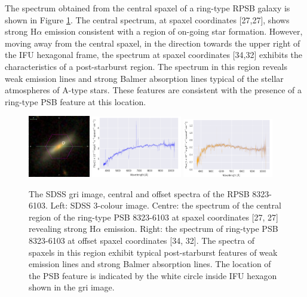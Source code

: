 The spectrum obtained from the central spaxel of a ring-type RPSB galaxy is shown in Figure \ref{fig:RPSB-8323-6103-spec}. The central spectrum, at spaxel coordinates [27,27], shows strong H$\alpha$ emission consistent with a region of on-going star formation. However, moving away from the central spaxel, in the direction towards the upper right of the IFU hexagonal frame, the spectrum at spaxel coordinates [34,32] exhibits the characteristics of a post-starburst region. The spectrum in this region reveals weak emission lines and strong Balmer absorption lines typical of the stellar atmospheres of A-type stars. These features are consistent with the presence of a ring-type PSB feature at this location.

\begin{figure}
    \centering
    \includegraphics[width=0.24\textwidth]{images/Cutouts/RPSB-8323-6103-CIRCLED.png}
    \hfill
    \includegraphics[width=0.35\textwidth]{images/Spectra/RPSB-8323-6103-27-27.png}
    \hfill
    \includegraphics[width=0.35\textwidth]{images/Spectra/RPSB-8323-6103-34-32.png}
    \caption[Image and central and offset spectra of the RPSB 8323-6103]{The SDSS gri image, central and offset spectra of the RPSB 8323-6103. Left: SDSS 3-colour image. 
    Centre: the spectrum of the central region of the ring-type PSB 8323-6103 at spaxel coordinates [27, 27] revealing strong H$\alpha$ emission. 
    Right: the spectrum of ring-type PSB 8323-6103 at offset spaxel coordinates [34, 32]. The spectra of spaxels in this region exhibit typical post-starburst features of weak emission lines and strong Balmer absorption lines. The location of the PSB feature is indicated by the white circle inside IFU hexagon shown in the gri image.}
    \label{fig:RPSB-8323-6103-spec}
\end{figure}

